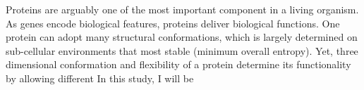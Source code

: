 Proteins are arguably one of the most important component in a living organism. As genes encode biological features, proteins deliver biological functions. One protein can adopt many structural conformations, which is largely determined on sub-cellular environments that most stable (minimum overall entropy). Yet, three dimensional conformation and flexibility of a protein determine its functionality by allowing different     In this study, I will be 